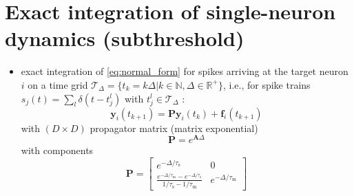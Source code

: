 \documentclass[10pt,a4paper,twoside,american]{article}
\theoremstyle{definitionstyle}
\newcommand{\tauM}{\tau_\text{m}}
\newcommand{\tauS}{\tau_\text{s}}
\begin{document}
\section{Exact integration of  single-neuron dynamics (subthreshold)}
\label{sec:exact_integration}

\begin{itemize}
\item exact integration of \eqref{eq:normal_form} for spikes arriving at the target neuron $i$ on a time grid
  \mbox{$\mathcal{T}_\Delta= \{t_k=k\Delta{}|k\in\mathbb{N},\Delta\in\mathbb{R}^+\}$}, i.e.,
  for spike trains \mbox{$s_j(t) = \sum_l\delta(t-t_j^l)$} with $t_j^l\in\mathcal{T}_\Delta$ \citep{Rotter99_381}:
  \begin{equation}
    \label{eq:exact_integration}
    \bm{y}_i(t_{k+1}) = \bm{P}\bm{y}_i(t_k) + \bm{f}_i(t_{k+1})
  \end{equation}
  with $(D\times{}D)$ propagator matrix (matrix exponential)
  \begin{equation}
    \label{eq:matrix_exponential}
    \bm{P} = e^{\bm{A}\Delta}
  \end{equation}
  with components 
  \begin{equation}
	\bm{P} =
	\begin{bmatrix}
      		e^{-\Delta/\tauS} 					     & 0\\
		\frac{e^{-\Delta/\tauM}-e^{-\Delta/\tauS}}{1/\tauS-1/\tauM}  & e^{-\Delta/\tauM}
    	\end{bmatrix}
  \end{equation}
  \citep[see Sec.\,3.2.2 in][]{Rotter99_381}
\end{itemize}
\end{document}
